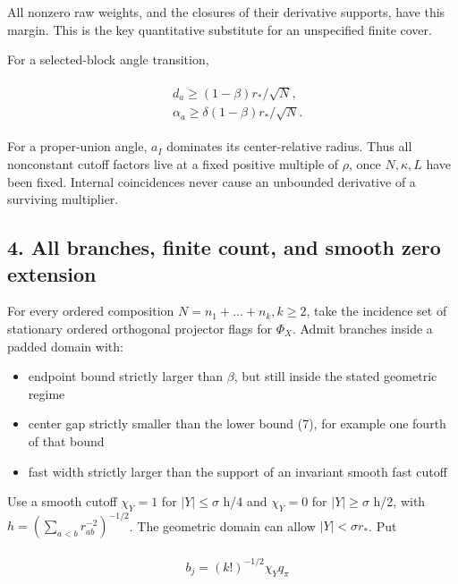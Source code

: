 All nonzero raw weights, and the closures of their derivative supports,
have this margin. This is the key quantitative substitute for an
unspecified finite cover.

For a selected-block angle transition,

\begin{gather*}
\begin{aligned}
& d_{a} \ge  (1-\beta ) r_{*}/\sqrt{N}, \\
& \alpha _{a} \ge  \delta (1-\beta )r_{*}/\sqrt{N}.
\end{aligned}\tag{8}
\end{gather*}

For a proper-union angle, \(a_{I}\) dominates its center-relative
radius. Thus all nonconstant cutoff factors live at a fixed positive
multiple of \(\rho\), once \(N,\kappa ,L\) have been fixed. Internal
coincidences never cause an unbounded derivative of a surviving
multiplier.

\subsection{4. All branches, finite count, and smooth zero
extension}\label{j-all-branches-finite-count-and-smooth-zero-extension}

For every ordered composition \(N=n_{1}+\ldots +n_{k}, k\ge 2\), take
the incidence set of stationary ordered orthogonal projector flags for
\(\Phi _{X}\). Admit branches inside a padded domain with:

\begin{itemize}
\tightlist
\item
  endpoint bound strictly larger than \(\beta\), but still inside the
  stated geometric regime
\item
  center gap strictly smaller than the lower bound (7), for example one
  fourth of that bound
\item
  fast width strictly larger than the support of an invariant smooth
  fast cutoff
\end{itemize}

Use a smooth cutoff \(\chi _{Y}=1\) for \(\vert Y\vert \le \sigma\) h/4
and \(\chi _{Y}=0\) for \(\vert Y\vert \ge \sigma\) h/2, with
\(h=(\sum _{a<b}r_{ab}^{-2})^{-1/2}\). The geometric domain can allow
\(\vert Y\vert <\sigma  r_{*}\). Put

\begin{gather*}
\begin{aligned}
& b_{j}=(k!)^{-1/2} \chi _{Y} q_{\pi}
\end{aligned}\tag{9}
\end{gather*}

